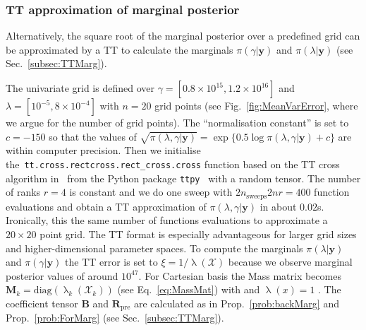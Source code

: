 \subsubsection{TT approximation of marginal posterior}
\label{subsec:TTFirst}
Alternatively, the square root of the marginal posterior over a predefined grid can be approximated by a TT to calculate the marginals $\pi(\gamma|\bm{y})$ and $\pi(\lambda|\bm{y})$ (see Sec.~\ref{subsec:TTMarg}).

The univariate grid is defined over $\gamma = [ 0.8 \times 10^{15},1.2 \times 10^{16}]$ and $\lambda = [ 10^{-5}, 8 \times 10^{-4}]$ with $n = 20$ grid points (see Fig.~\ref{fig:MeanVarError}, where we argue for the number of grid points).
The ``normalisation constant'' is set to $c=-150$ so that the values of $\sqrt{\pi(\lambda,\gamma| \bm{y})}=\exp\{0.5\log\pi(\lambda,\gamma|\bm{y})+c\}$ are within computer precision.
Then we initialise \linebreak the~\texttt{tt.cross.rectcross.rect\_cross.cross} function based on the TT cross algorithm in~\cite{OSELEDETS2010TTCross,Dolgov2018TTCross} from the Python package \texttt{ttpy}~\cite{Oseledets2018ttpy} with a random tensor.
The number of ranks $r = 4$ is constant and we do one sweep with $2n_{\text{sweeps}}2nr =400$ function evaluations and obtain a TT approximation of $\pi( \lambda,\gamma| \bm{y})$ in about $0.02$s.
Ironically, this the same number of functions evaluations to approximate a $20 \times 20$ point grid.
The TT format is especially advantageous for larger grid sizes and higher-dimensional parameter spaces.
To compute the marginals $\pi(\lambda| \bm{y})$ and $\pi(\gamma| \bm{y})$ the TT error is set to $\xi = 1 / \uplambda (\mathcal{X})$ because we observe marginal posterior values of around $10^{47}$.
For Cartesian basis the Mass matrix becomes $\bm{M}_k = \text{diag}(\uplambda_k(\mathcal{X}_k))$ (see Eq.~\ref{eq:MassMat}) with and $\uplambda(x) = 1$ .
The coefficient tensor $\bm{B}$ and $\bm{R}_{\text{pre}}$ are calculated as in Prop.~\ref{prob:backMarg} and Prop.~\ref{prob:ForMarg} (see Sec.~\ref{subsec:TTMarg}).

